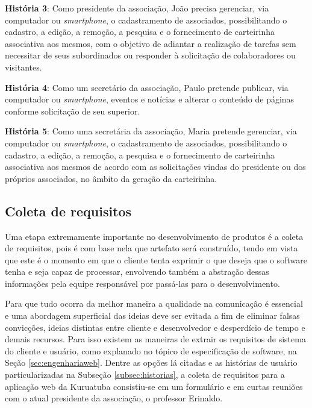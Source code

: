 \textbf{História 3}: Como presidente da associação, João precisa gerenciar, via computador ou \textit{smartphone}, o cadastramento de associados, possibilitando o cadastro, a edição, a remoção, a pesquisa e o fornecimento de carteirinha associativa aos mesmos, com o objetivo de adiantar a realização de tarefas sem necessitar de seus subordinados ou responder à solicitação de colaboradores ou visitantes.

\textbf{História 4}: Como um secretário da associação, Paulo pretende publicar, via computador ou \textit{smartphone}, eventos e notícias e alterar o conteúdo de páginas conforme solicitação de seu superior. 

\textbf{História 5}: Como uma secretária da associação, Maria pretende gerenciar, via computador ou \textit{smartphone}, o cadastramento de associados, possibilitando o cadastro, a edição, a remoção, a pesquisa e o fornecimento de carteirinha associativa aos mesmos de acordo com as solicitações vindas do presidente ou dos próprios associados, no âmbito da geração da carteirinha.

\hspace{2.5cm}
\subsection{Coleta de requisitos}
\label{subsec:requisitos}
\hspace{2.5cm}

Uma etapa extremamente importante no desenvolvimento de produtos é a coleta de requisitos, pois é com base nela que artefato será construído, tendo em vista que este é o momento em que o cliente tenta exprimir o que deseja que o software tenha e seja capaz de processar, envolvendo também a abstração dessas informações pela equipe responsável por passá-las para o desenvolvimento. 

Para que tudo ocorra da melhor maneira a qualidade na comunicação é essencial e uma abordagem superficial das ideias deve ser evitada a fim de eliminar falsas convicções, ideias distintas entre cliente e desenvolvedor e desperdício de tempo e demais recursos. Para isso existem as maneiras de extrair os requisitos de sistema do cliente e usuário, como explanado no tópico de especificação de software, na Seção \ref{sec:engenhariaweb}. Dentre as opções lá citadas e as histórias de usuário particularizadas na Subseção \ref{subsec:historias}, a coleta de requisitos para a aplicação web da Kuruatuba consistiu-se em um formulário e em curtas reuniões com o atual presidente da associação, o professor Erinaldo. 

